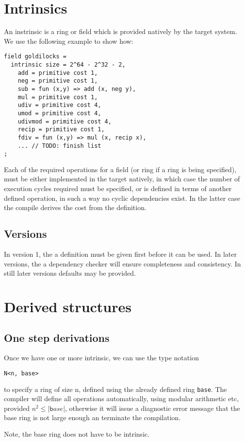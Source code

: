 \documentclass[oneside]{book}
\theoremstyle{plain}
\theoremstyle{definition}
\theoremstyle{plain}
\begin{document}
\section{Intrinsics}
An instrinsic is a ring or field which is provided natively by the target system.
We use the following example to show how:
\begin{verbatim}
field goldilocks = 
  intrinsic size = 2^64 - 2^32 - 2, 
    add = primitive cost 1,
    neg = primitive cost 1,
    sub = fun (x,y) => add (x, neg y),
    mul = primitive cost 1,
    udiv = primitive cost 4,
    umod = primitive cost 4,
    udivmod = primitive cost 4,
    recip = primitive cost 1,
    fdiv = fun (x,y) => mul (x, recip x),
    ... // TODO: finish list
;
\end{verbatim}
Each of the required operations for a field (or ring if a ring is being specified),
must be either implemented in the target natively, in which case the number of
execution cycles required must be specified, or is defined in terms of another
defined operation, in such a way no cyclic dependencies exist. In the latter case
the compile derives the cost from the definition.

\subsection{Versions}
In version 1, the a definition must be given first before it can be used.
In later versions, the a dependency checker will ensure completeness
and consistency. In still later versions defaults may be provided.

\section{Derived structures}
\subsection{One step derivations}
Once we have one or more intrinsic, we can use the type notation
\begin{verbatim}
N<n, base>
\end{verbatim}
to specify a ring of size n, defined using the already defined ring \verb$base$.
The compiler will define all operations automatically, using modular arithmetic
etc, provided $n^2\leq |{\mathtt base}|$, otherwise it will issue a diagnostic
error message that the base ring is not large enough an terminate the compilation.

Note, the base ring does not have to be intrinsic.
\end{document}
